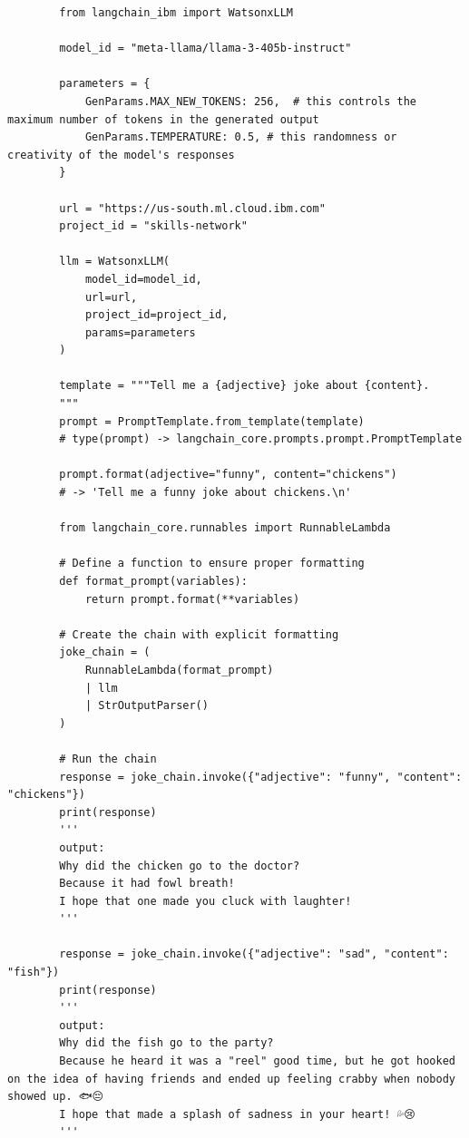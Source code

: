 \begin{listing}
    \begin{verbatim}
        from langchain_ibm import WatsonxLLM
        
        model_id = "meta-llama/llama-3-405b-instruct"
        
        parameters = {
            GenParams.MAX_NEW_TOKENS: 256,  # this controls the maximum number of tokens in the generated output
            GenParams.TEMPERATURE: 0.5, # this randomness or creativity of the model's responses
        }
        
        url = "https://us-south.ml.cloud.ibm.com"
        project_id = "skills-network"
        
        llm = WatsonxLLM(
            model_id=model_id,
            url=url,
            project_id=project_id,
            params=parameters
        )
        
        template = """Tell me a {adjective} joke about {content}.
        """
        prompt = PromptTemplate.from_template(template)
        # type(prompt) -> langchain_core.prompts.prompt.PromptTemplate
        
        prompt.format(adjective="funny", content="chickens")
        # -> 'Tell me a funny joke about chickens.\n'
        
        from langchain_core.runnables import RunnableLambda
        
        # Define a function to ensure proper formatting
        def format_prompt(variables):
            return prompt.format(**variables)
        
        # Create the chain with explicit formatting
        joke_chain = (
            RunnableLambda(format_prompt)
            | llm 
            | StrOutputParser()
        )
        
        # Run the chain
        response = joke_chain.invoke({"adjective": "funny", "content": "chickens"})
        print(response)
        '''
        output:
        Why did the chicken go to the doctor?
        Because it had fowl breath!
        I hope that one made you cluck with laughter!
        '''
        
        response = joke_chain.invoke({"adjective": "sad", "content": "fish"})
        print(response)
        '''
        output:
        Why did the fish go to the party?
        Because he heard it was a "reel" good time, but he got hooked on the idea of having friends and ended up feeling crabby when nobody showed up. 🐟😔
        I hope that made a splash of sadness in your heart! 💦😢
        '''
    \end{verbatim}
    \caption[Eerste voorbeeld van code met LangChain]{Een eerste code voorbeeld van LangChain, \autocite{IBM2026}}
    \label{lst:langchaineerstecodevoorbeeld}
\end{listing}

